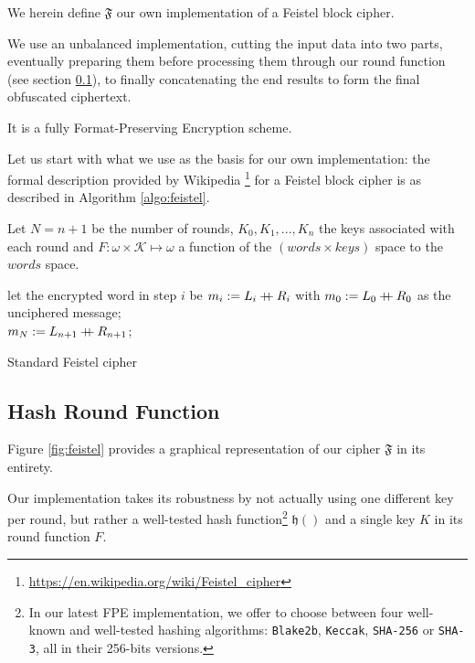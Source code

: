 \documentclass[twoside,twocolumn]{article}
\newcommand{\concat}{\mathbin{{+}\mspace{-8mu}{+}}}
\theoremstyle{definition}
\theoremstyle{remark}
\begin{document}
We herein define $\mathfrak{F}$ our own implementation of a Feistel block cipher\cite{feistel:hf}. 

We use an unbalanced implementation, cutting the input data into two parts, eventually preparing them before processing them through our round function 
(see section \ref{roundFunction}), to finally concatenating the end results to form the final obfuscated ciphertext.

It is a fully Format-Preserving Encryption scheme.

Let us start with what we use as the basis for our own implementation: the formal description provided by Wikipedia
\footnote{\url{https://en.wikipedia.org/wiki/Feistel_cipher}} for a Feistel block cipher is as described in Algorithm \ref{algo:feistel}.

Let $N = n+1$ be the number of rounds, $K_{0},K_{1},...,K_{n}$ the keys associated with each round and $F: \omega \times \mathcal{K} \mapsto \omega$ a 
function of the $(words \times keys)$ space to the $words$ space.
\begin{algorithm}
    let the encrypted word in step $i$ be $m_i := L_i \concat R_i$ with $m_0 := L_0 \concat R_0$ as the unciphered message; \\
    $m_N := L_{n+1} \concat R_{n+1}$; \\
    \caption{Standard Feistel cipher}
    \label{algo:feistel}
\end{algorithm}

\subsection{Hash Round Function}
\label{roundFunction}

Figure \ref{fig:feistel} provides a graphical representation of our cipher $\mathfrak{F}$ in its entirety.

Our implementation takes its robustness by not actually using one different key per round, but rather a well-tested hash function\footnote{
    In our latest FPE implementation, we offer to choose between four well-known and well-tested hashing algorithms: \texttt{Blake2b}, 
    \texttt{Keccak}, \texttt{SHA-256} or \texttt{SHA-3}, all in their 256-bits versions. 
} $\mathfrak{h}()$ and a single key $K$ in its round function $F$.
\end{document}
